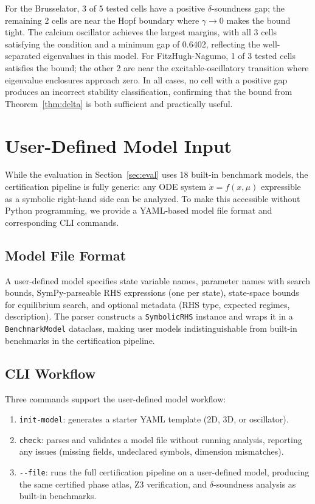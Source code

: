\documentclass[11pt]{article}
\begin{document}
For the Brusselator, 3 of 5 tested cells have a positive $\delta$-soundness gap; the remaining 2 cells are near the Hopf boundary where $\gamma \to 0$ makes the bound tight.
The calcium oscillator achieves the largest margins, with all 3 cells satisfying the condition and a minimum gap of 0.6402, reflecting the well-separated eigenvalues in this model.
For FitzHugh-Nagumo, 1 of 3 tested cells satisfies the bound; the other 2 are near the excitable-oscillatory transition where eigenvalue enclosures approach zero.
In all cases, no cell with a positive gap produces an incorrect stability classification, confirming that the bound from Theorem~\ref{thm:delta} is both sufficient and practically useful.

\section{User-Defined Model Input}
\label{sec:user-input}

While the evaluation in Section~\ref{sec:eval} uses 18 built-in benchmark models, the certification pipeline is fully generic: any ODE system $\dot{x} = f(x, \mu)$ expressible as a symbolic right-hand side can be analyzed. To make this accessible without Python programming, we provide a YAML-based model file format and corresponding CLI commands.

\subsection{Model File Format}

A user-defined model specifies state variable names, parameter names with search bounds, SymPy-parseable RHS expressions (one per state), state-space bounds for equilibrium search, and optional metadata (RHS type, expected regimes, description). The parser constructs a \texttt{SymbolicRHS} instance and wraps it in a \texttt{BenchmarkModel} dataclass, making user models indistinguishable from built-in benchmarks in the certification pipeline.

\subsection{CLI Workflow}

Three commands support the user-defined model workflow:
\begin{enumerate}
    \item \texttt{init-model}: generates a starter YAML template (2D, 3D, or oscillator).
    \item \texttt{check}: parses and validates a model file without running analysis, reporting any issues (missing fields, undeclared symbols, dimension mismatches).
    \item \texttt{-{}-file}: runs the full certification pipeline on a user-defined model, producing the same certified phase atlas, Z3 verification, and $\delta$-soundness analysis as built-in benchmarks.
\end{enumerate}
\end{document}
